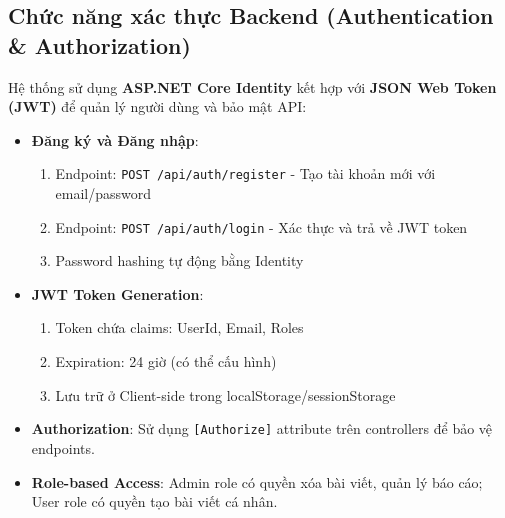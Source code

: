 \documentclass[a4paper]{article}
\begin{document}
    \subsection{Chức năng xác thực Backend (Authentication \& Authorization)}
    Hệ thống sử dụng \textbf{ASP.NET Core Identity} kết hợp với \textbf{JSON Web Token (JWT)} để quản lý người dùng và bảo mật API:
    \begin{itemize}
        \item \textbf{Đăng ký và Đăng nhập}: 
        \begin{enumerate}
            \item Endpoint: \texttt{POST /api/auth/register} - Tạo tài khoản mới với email/password
            \item Endpoint: \texttt{POST /api/auth/login} - Xác thực và trả về JWT token
            \item Password hashing tự động bằng Identity
        \end{enumerate}
        \item \textbf{JWT Token Generation}: 
        \begin{enumerate}
            \item Token chứa claims: UserId, Email, Roles
            \item Expiration: 24 giờ (có thể cấu hình)
            \item Lưu trữ ở Client-side trong localStorage/sessionStorage
        \end{enumerate}
        \item \textbf{Authorization}: Sử dụng \texttt{[Authorize]} attribute trên controllers để bảo vệ endpoints.
        \item \textbf{Role-based Access}: Admin role có quyền xóa bài viết, quản lý báo cáo; User role có quyền tạo bài viết cá nhân.
    \end{itemize}
\end{document}
